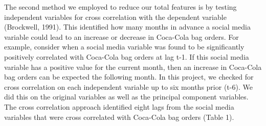 \documentclass[12pt,oneside]{chicagocapstone}
\begin{document}
The second method we employed to reduce our total features is by testing independent variables for cross correlation with the dependent variable (Brockwell, 1991). This identified how many months in advance a social media variable could lead to an increase or decrease in Coca-Cola bag orders. For example, consider when a social media variable was found to be significantly positively correlated with Coca-Cola bag orders at lag t-1. If this social media variable has a positive value for the current month, then an increase in Coca-Cola bag orders can be expected the following month. In this project, we checked for cross correlation on each independent variable up to six months prior (t-6). We did this on the original variables as well as the principal component variables. The cross correlation approach identified eight lags from the social media variables that were cross correlated with Coca-Cola bag orders (Table 1).
\end{document}
